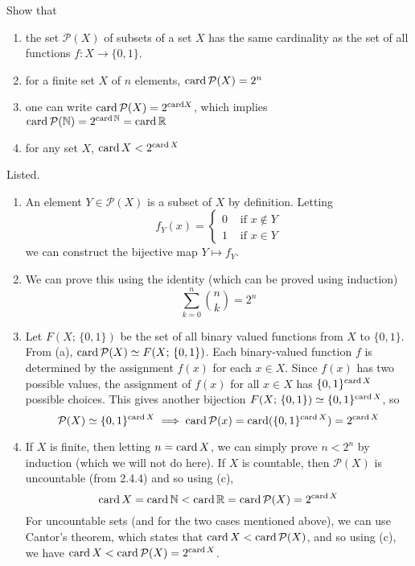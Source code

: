   \begin{exercise}[Zorich 2.4.5]
    Show that 
    \begin{enumerate}
      \item the set $\mathcal{P}(X)$ of subsets of a set $X$ has the same cardinality as the set of all functions $f: X \longrightarrow \{0, 1\}$. 
      \item for a finite set $X$ of $n$ elements, $\card{\mathcal{P}(X)} = 2^n$ 
      \item one can write $\card{\mathcal{P}(X)} = 2^{\text{card}{X}}$, which implies $\text{card}\, \mathcal{P}(\mathbb{N}) = 2^{\card \mathbb{N}} = \card \mathbb{R}$ 
      \item for any set $X$, $\card{X} < 2^{\card{X}}$
    \end{enumerate}
  \end{exercise}
  \begin{solution}
    Listed. 
    \begin{enumerate}
      \item An element $Y \in \mathcal{P}(X)$ is a subset of $X$ by definition. Letting 
      \[f_Y (x) = \begin{cases} 0 & \text{ if } x \not\in Y \\
      1 & \text{ if } x \in Y \end{cases}\]
      we can construct the bijective map $Y \mapsto f_Y$. 
      \item We can prove this using the identity (which can be proved using induction) 
        \[\sum_{k=0}^n \binom{n}{k} = 2^n \]
      \item Let $F(X; \, \{0, 1\})$ be the set of all binary valued functions from $X$ to $\{0, 1\}$. From (a), $\card{\mathcal{P}(X)} \simeq F(X; \, \{0, 1\})$. Each binary-valued function $f$ is determined by the assignment $f(x)$ for each $x \in X$. Since $f(x)$ has two possible values, the assignment of $f(x)$ for all $x \in X$ has $\{0, 1\}^{\card{X}}$ possible choices. This gives another bijection $F(X; \, \{0, 1\}) \simeq \{0, 1\}^{\card{X}}$, so 
      \[\mathcal{P}(X) \simeq \{0, 1\}^{\card{X}} \implies \card{\mathcal{P}(x)} = \card(\{0, 1\}^{\card{X}}) = 2^{\card{X}} \]
      \item If $X$ is finite, then letting $n = \card{X}$, we can simply prove $n < 2^n$ by induction (which we will not do here). If $X$ is countable, then $\mathcal{P}(X)$ is uncountable (from 2.4.4) and so using (c), 
      \[\card{X} = \card{\mathbb{N}} < \card{\mathbb{R}} = \card{\mathcal{P}(X)} = 2^{\card{X}}\]
      For uncountable sets (and for the two cases mentioned above), we can use Cantor's theorem, which states that $\card{X} < \card{\mathcal{P}(X)}$, and so using (c), we have $\card{X} < \card{\mathcal{P}(X)} = 2^{\card{X}}$. 
    \end{enumerate}
  \end{solution}

